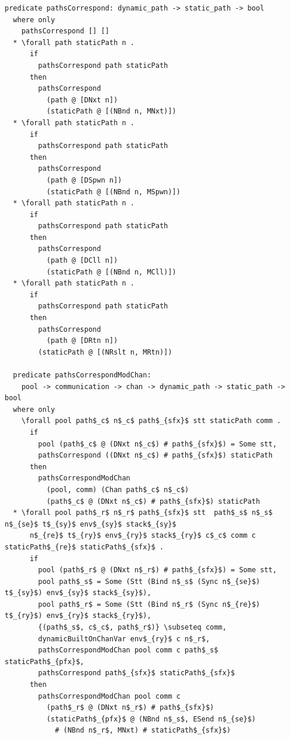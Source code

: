 \documentclass[letterpaper, 11pt]{extarticle}
\begin{document}
\begin{lstlisting}[language=logic, mathescape]
  predicate pathsCorrespond: dynamic_path -> static_path -> bool
  where only
    pathsCorrespond [] []
  * \forall path staticPath n .
      if
        pathsCorrespond path staticPath
      then
        pathsCorrespond
          (path @ [DNxt n])
          (staticPath @ [(NBnd n, MNxt)])
  * \forall path staticPath n .
      if
        pathsCorrespond path staticPath
      then
        pathsCorrespond
          (path @ [DSpwn n])
          (staticPath @ [(NBnd n, MSpwn)])
  * \forall path staticPath n .
      if
        pathsCorrespond path staticPath
      then
        pathsCorrespond
          (path @ [DCll n])
          (staticPath @ [(NBnd n, MCll)])
  * \forall path staticPath n .
      if
        pathsCorrespond path staticPath
      then
        pathsCorrespond
          (path @ [DRtn n])
        (staticPath @ [(NRslt n, MRtn)])

  predicate pathsCorrespondModChan:
    pool -> communication -> chan -> dynamic_path -> static_path -> bool
  where only
    \forall pool path$_c$ n$_c$ path$_{sfx}$ stt staticPath comm .
      if
        pool (path$_c$ @ (DNxt n$_c$) # path$_{sfx}$) = Some stt,
        pathsCorrespond ((DNxt n$_c$) # path$_{sfx}$) staticPath
      then
        pathsCorrespondModChan
          (pool, comm) (Chan path$_c$ n$_c$)
          (path$_c$ @ (DNxt n$_c$) # path$_{sfx}$) staticPath
  * \forall pool path$_r$ n$_r$ path$_{sfx}$ stt  path$_s$ n$_s$ n$_{se}$ t$_{sy}$ env$_{sy}$ stack$_{sy}$
      n$_{re}$ t$_{ry}$ env$_{ry}$ stack$_{ry}$ c$_c$ comm c staticPath$_{re}$ staticPath$_{sfx}$ . 
      if
        pool (path$_r$ @ (DNxt n$_r$) # path$_{sfx}$) = Some stt, 
        pool path$_s$ = Some (Stt (Bind n$_s$ (Sync n$_{se}$) t$_{sy}$) env$_{sy}$ stack$_{sy}$),
        pool path$_r$ = Some (Stt (Bind n$_r$ (Sync n$_{re}$) t$_{ry}$) env$_{ry}$ stack$_{ry}$),
        {(path$_s$, c$_c$, path$_r$)} \subseteq comm, 
        dynamicBuiltOnChanVar env$_{ry}$ c n$_r$, 
        pathsCorrespondModChan pool comm c path$_s$ staticPath$_{pfx}$,
        pathsCorrespond path$_{sfx}$ staticPath$_{sfx}$
      then
        pathsCorrespondModChan pool comm c
          (path$_r$ @ (DNxt n$_r$) # path$_{sfx}$)
          (staticPath$_{pfx}$ @ (NBnd n$_s$, ESend n$_{se}$)
            # (NBnd n$_r$, MNxt) # staticPath$_{sfx}$)
\end{lstlisting}
\end{document}
